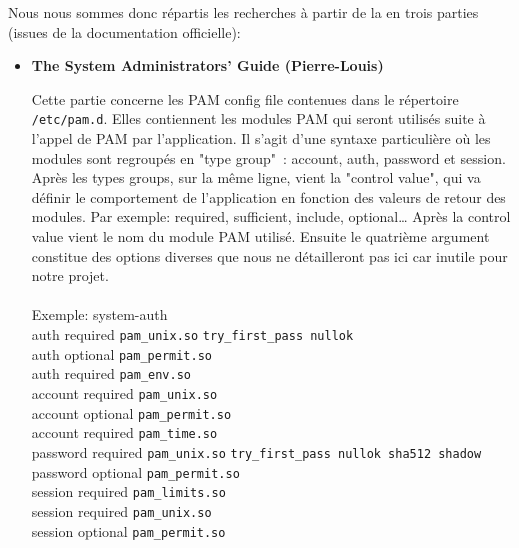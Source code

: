 \documentclass[french]{report}
\begin{document}
  Nous nous sommes donc répartis les recherches à partir de la en trois parties
  (issues de la documentation officielle):
  \vspace{0.5cm}
  \begin{itemize}[label=\textbullet, font=\normalfont \color{blue}]
    \item{\textbf{The System Administrators' Guide (Pierre-Louis)}}

    \vspace{0.05cm}

Cette partie concerne les PAM config file contenues dans le répertoire
\verb|/etc/pam.d|. Elles contiennent les modules PAM qui seront utilisés suite à
l’appel de PAM par l’application. Il s’agit d’une syntaxe particulière où les
modules sont regroupés en "type group" : account, auth, password et session.
Après les types groups, sur la même ligne, vient la "control value", qui va
définir le comportement de l’application en fonction des valeurs de retour des
modules. Par exemple: required, sufficient, include, optional… Après la control
value vient le nom du module PAM utilisé. Ensuite le quatrième argument
constitue des options diverses que nous ne détailleront pas ici car inutile
pour notre projet.
\\ \\
    Exemple: system-auth \\

    auth      required  \texttt{pam\_unix.so}   \texttt{try\_first\_pass
    nullok} \\
    auth      optional  \texttt{pam\_permit.so} \\
    auth      required  \texttt{pam\_env.so} \\

    account   required  \texttt{pam\_unix.so} \\
    account   optional  \texttt{pam\_permit.so} \\
    account   required  \texttt{pam\_time.so} \\

    password  required  \texttt{pam\_unix.so}   \texttt{try\_first\_pass nullok
    sha512 shadow} \\
    password  optional  \texttt{pam\_permit.so} \\

    session   required  \texttt{pam\_limits.so} \\
    session   required  \texttt{pam\_unix.so} \\
    session   optional  \texttt{pam\_permit.so} \\


\end{itemize}
\end{document}
